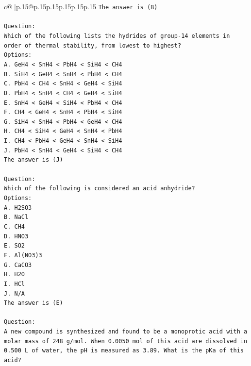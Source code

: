 \documentclass{article}
\begin{document}
{\begin{supertabular}{c@{$\;$}|p{.15\linewidth}@{}p{.15\linewidth}p{.15\linewidth}p{.15\linewidth}p{.15\linewidth}p{.15\linewidth}}
{{{\texttt{The answer is (B)} \\
\\ 
\texttt{Question:} \\
\texttt{Which of the following lists the hydrides of group{-}14 elements in order of thermal stability, from lowest to highest?} \\
\texttt{Options:} \\
\texttt{A. GeH4 < SnH4 < PbH4 < SiH4 < CH4} \\
\texttt{B. SiH4 < GeH4 < SnH4 < PbH4 < CH4} \\
\texttt{C. PbH4 < CH4 < SnH4 < GeH4 < SiH4} \\
\texttt{D. PbH4 < SnH4 < CH4 < GeH4 < SiH4} \\
\texttt{E. SnH4 < GeH4 < SiH4 < PbH4 < CH4} \\
\texttt{F. CH4 < GeH4 < SnH4 < PbH4 < SiH4} \\
\texttt{G. SiH4 < SnH4 < PbH4 < GeH4 < CH4} \\
\texttt{H. CH4 < SiH4 < GeH4 < SnH4 < PbH4} \\
\texttt{I. CH4 < PbH4 < GeH4 < SnH4 < SiH4} \\
\texttt{J. PbH4 < SnH4 < GeH4 < SiH4 < CH4} \\
\texttt{The answer is (J)} \\
\\ 
\texttt{Question:} \\
\texttt{Which of the following is considered an acid anhydride?} \\
\texttt{Options:} \\
\texttt{A. H2SO3} \\
\texttt{B. NaCl} \\
\texttt{C. CH4} \\
\texttt{D. HNO3} \\
\texttt{E. SO2} \\
\texttt{F. Al(NO3)3} \\
\texttt{G. CaCO3} \\
\texttt{H. H2O} \\
\texttt{I. HCl} \\
\texttt{J. N/A} \\
\texttt{The answer is (E)} \\
\\ 
\texttt{Question:} \\
\texttt{A new compound is synthesized and found to be a monoprotic acid with a molar mass of 248 g/mol. When 0.0050 mol of this acid are dissolved in 0.500 L of water, the pH is measured as 3.89. What is the pKa of this acid?} \\
}}}
\end{supertabular}}
\end{document}
